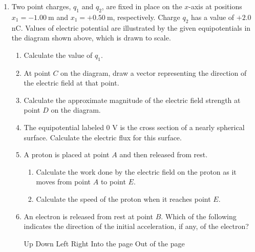 \documentclass{../../../oss-apphys}
\begin{document}
\begin{enumerate}
\item Two point charges, $q_1$ and $q_2$, are fixed in place on the $x$-axis at
  positions $x_1=\SI{-1.00}{\metre}$ and $x_1=+\SI{0.50}{\metre}$,
  respectively. Charge $q_2$ has a value of $+2.0$ nC. Values of electric
  potential are illustrated by the given equipotentials in the diagram shown
  above, which is drawn to scale.
  \begin{enumerate}
  \item Calculate the value of $q_1$.
  \item At point $C$ on the diagram, draw a vector representing the direction
    of the electric field at that point.
  \item Calculate the approximate magnitude of the electric field strength at
    point $D$ on the diagram.
  \item The equipotential labeled 0 V is the cross section of a nearly
    spherical surface. Calculate the electric flux for this surface.
  \item A proton is placed at point $A$ and then released from rest.
    \begin{enumerate}
    \item Calculate the work done by the electric field on the proton as it
      moves from point $A$ to point $E$.
    \item Calculate the speed of the proton when it reaches point $E$.
    \end{enumerate}
  \item An electron is released from rest at point $B$. Which of the following
    indicates the direction of the initial acceleration, if any, of the
    electron?

    \vspace{.1in}
    \underline{\hspace{.3in}} Up\hspace{.2in}
    \underline{\hspace{.3in}} Down\hspace{.2in}
    \underline{\hspace{.3in}} Left\hspace{.2in}
    \underline{\hspace{.3in}} Right\hspace{.2in}
    \underline{\hspace{.3in}} Into the page\hspace{.2in}
    \underline{\hspace{.3in}} Out of the page


\end{enumerate}
\end{enumerate}
\end{document}
